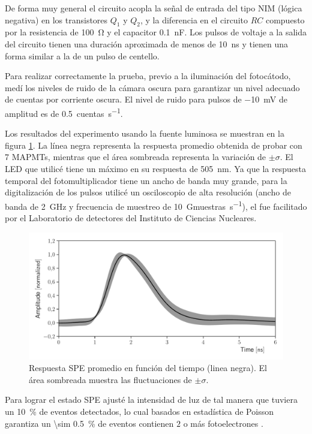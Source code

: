 De forma muy general el circuito acopla la señal de entrada del tipo NIM (lógica negativa) en los transistores $Q_{1}$ y $Q_{2}$, y la diferencia en el circuito $RC$ compuesto por la resistencia de \SI{100}{\ohm} y el capacitor \SI{0.1}{\nano\farad}. Los pulsos de voltaje a la salida del circuito tienen una duración aproximada de menos de \SI{10}{\nano\second} y tienen una forma similar a la de un pulso de centello.

Para realizar correctamente la prueba, previo a la iluminación del fotocátodo, medí los niveles de ruido de la cámara oscura para garantizar un nivel adecuado de cuentas por corriente oscura. El nivel de ruido para pulsos de \SI{-10}{\milli\volt} de amplitud es de \SI{0.5}{cuentas\per\second}.

Los resultados del experimento usando la fuente luminosa se muestran en la figura \ref{fig:sphe}. La línea negra representa la respuesta promedio obtenida de probar con \num{7} MAPMTs, mientras que el área sombreada representa la variación de $\pm\sigma$. El LED que utilicé tiene un máximo en su respuesta de \SI{505}{\nano\metre}. Ya que la respuesta temporal del fotomultiplicador tiene un ancho de banda muy grande, para la digitalización de los pulsos utilicé un osciloscopio de alta resolución  (ancho de banda de \SI{2}{\giga\hertz} y frecuencia de muestreo de \SI{10}{\giga muestras\per\second}), el fue facilitado por el Laboratorio de detectores del Instituto de Ciencias Nucleares.

\begin{figure}
        \centering
        \includegraphics[width=\textwidth]{sphe-signal.pdf}
        \caption{Respuesta SPE promedio en función del tiempo (linea negra). El área sombreada muestra las fluctuaciones de $\pm\sigma$.}
        \label{fig:sphe}
\end{figure}

Para lograr el estado SPE ajusté la intensidad de luz de tal manera que tuviera un \SI{10}{\percent} de eventos detectados, lo cual basados en estadística de Poisson garantiza un \SI{\sim 0.5}{\percent} de eventos contienen $2$ o más fotoelectrones \cite{barnhill08}.

